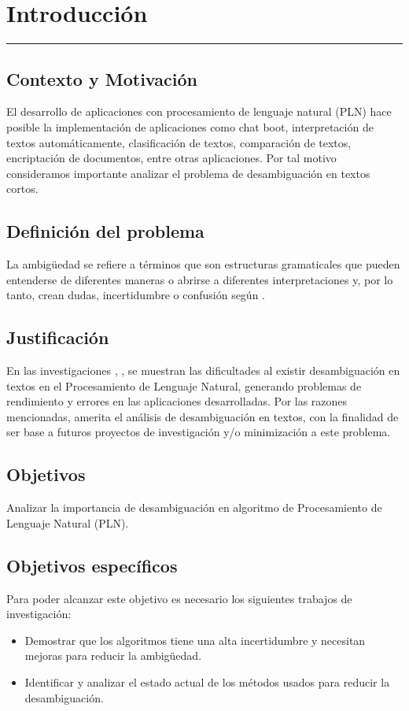 \chapter{Introducción}
\hrule \bigskip \vspace*{1cm}
\section{Contexto y Motivación}
El desarrollo de aplicaciones con procesamiento de lenguaje natural (PLN) hace posible la implementación de aplicaciones como chat boot, interpretación de textos automáticamente,  clasificación de textos, comparación de textos, encriptación de documentos, entre otras aplicaciones. Por tal motivo consideramos importante analizar el problema de desambiguación en textos cortos.

\section{Definición del problema}
La ambigüedad se refiere a términos que son estructuras gramaticales que pueden entenderse de diferentes maneras o abrirse a diferentes interpretaciones y, por lo tanto, crean dudas, incertidumbre o confusión según \cite{EvaluacionAmbiguedad01}.

\section{Justificación}
En las investigaciones \cite{ChatBoot}, \cite{055} , \cite{056} se muestran las dificultades al existir desambiguación en textos en el Procesamiento de Lenguaje Natural, generando problemas de rendimiento y errores en las aplicaciones desarrolladas. Por las razones mencionadas, amerita el análisis de desambiguación en textos, con la finalidad de ser base a futuros proyectos de investigación y/o minimización a este problema.

\section{Objetivos}

 Analizar la importancia de desambiguación en algoritmo de Procesamiento de Lenguaje Natural (PLN).

\section{Objetivos específicos}
Para poder alcanzar este objetivo es necesario los siguientes trabajos de investigación:
\begin{itemize}
  \item Demostrar que los algoritmos tiene una alta incertidumbre y necesitan mejoras para reducir la ambigüedad.
  \item Identificar y analizar el estado actual de los métodos usados para reducir la desambiguación.
\end{itemize}

